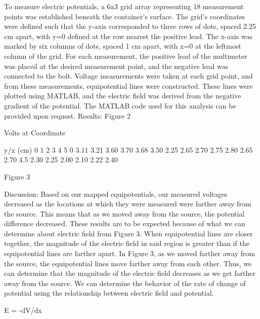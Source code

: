 To measure electric potentials, a 6x3 grid array representing 18 measurement points was established beneath the container’s surface. The grid's coordinates were defined such that the y-axis corresponded to three rows of dots, spaced 2.25 cm apart, with y=0 defined at the row nearest the positive lead. The x-axis was marked by six columns of dots, spaced 1 cm apart, with x=0 at the leftmost column of the grid. For each measurement, the positive lead of the multimeter was placed at the desired measurement point, and the negative lead was connected to the bolt.
Voltage measurements were taken at each grid point, and from these measurements, equipotential lines were constructed. These lines were plotted using MATLAB, and the electric field was derived from the negative gradient of the potential. The MATLAB code used for this analysis can be provided upon request.
Results:
Figure 2


	

	

	Volts at Coordinate 
	

	

	

	y/x (cm)
	0
	1
	2
	3
	4
	5
	0
	3.11
	3.21
	3.60
	3.70
	3.68
	3.50
	2.25
	2.65
	2.70
	2.75
	2.80
	2.65
	2.70
	4.5
	2.30
	2.25
	2.00
	2.10
	2.22
	2.40
	

Figure 3
  
  

          










Discussion:
        Based on our mapped equipotentials, our measured voltages decreased as the locations at which they were measured were farther away from the source. This means that as we moved away from the source, the potential difference decreased. These results are to be expected because of what we can determine about electric field from Figure 3. When equipotential lines are closer together, the magnitude of the electric field in said region is greater than if the equipotential lines are farther apart. In Figure 3, as we moved farther away from the source, the equipotential lines move farther away from each other. Thus, we can determine that the magnitude of the electric field decreases as we get farther away from the source. We can determine the behavior of the rate of change of potential using the relationship between electric field and potential.

E = -dV/dx


